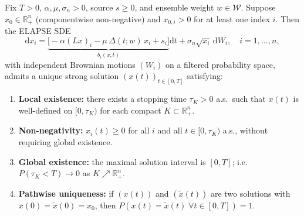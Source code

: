 %
%

\begin{theorem}
\label{thm:wellposed}
Fix $T>0$, $\alpha,\mu,\sigma_n>0$, source $s\ge 0$, and ensemble weight
$w\in\mathcal{W}$.  Suppose $x_0\in\mathbb{R}^n_+$ (componentwise non-negative)
and $x_{0,i}>0$ for at least one index $i$.  Then the ELAPSE SDE
\begin{equation}
  \mathrm{d}x_i = \underbrace{\bigl[-\alpha(Lx)_i - \mu\,\Delta(t;w)\,x_i + s_i\bigr]}_{b_i(x,t)}\mathrm{d}t
                  + \sigma_n\sqrt{x_i}\,\mathrm{d}W_i, \quad i=1,\ldots,n,
  \label{eq:elapse_sde_thm1}
\end{equation}
with independent Brownian motions $(W_i)$ on a filtered probability space,
admits a unique strong solution $(x(t))_{t\in[0,T]}$ satisfying:
\begin{enumerate}[label=(\roman*)]
  \item \textbf{Local existence:} there exists a stopping time $\tau_K>0$ a.s.\
    such that $x(t)$ is well-defined on $[0,\tau_K)$ for each compact
    $K\subset\mathbb{R}^n_+$.
  \item \textbf{Non-negativity:} $x_i(t)\ge 0$ for all $i$ and all
    $t\in[0,\tau_K)$ a.s., without requiring global existence.
  \item \textbf{Global existence:} the maximal solution interval is $[0,T]$;
    i.e.\ $P(\tau_K<T)\to 0$ as $K\nearrow\mathbb{R}^n_+$.
  \item \textbf{Pathwise uniqueness:} if $(x(t))$ and $(\tilde x(t))$ are
    two solutions with $x(0)=\tilde x(0)=x_0$, then
    $P(x(t)=\tilde x(t)\;\forall t\in[0,T])=1$.
\end{enumerate}
\end{theorem}

